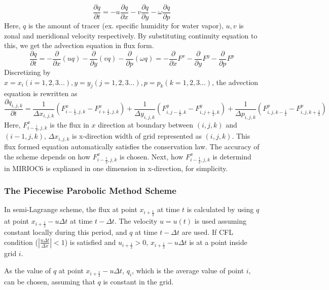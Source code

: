 \begin{equation}
\frac{\partial q}{\partial t} = -u \frac{\partial q}{\partial x}-v \frac{\partial q}{\partial y}-\omega \frac{\partial q}{\partial p}
\end{equation}
Here, $q$ is the amount of tracer (ex. specific humidity for water vapor), $u,v$ is zonal and meridional velocity respectively.
By substituting continuity equation to this, we get the advection equation in flux form.
\begin{equation}
  \frac{\partial q}{\partial t}=-\frac{\partial}{\partial x}(uq)-\frac{\partial}{\partial y}(vq)-\frac{\partial}{\partial p}(\omega q)
  =-\frac{\partial}{\partial x}F^{x}-\frac{\partial}{\partial y}F^{y}-\frac{\partial}{\partial p}F^{p}
\end{equation}
Discretizing by $x=x_{i} (i=1,2,3...), y=y_{j} (j=1,2,3...), p=p_{k} (k=1,2,3...)$, the advection equation is rewritten as
\begin{equation}
  \frac{\partial q_{i,j,k}}{\partial t}=\frac{1}{\Delta x_{i,j,k}}(F^{x}_{i-\frac{1}{2},j,k}-F^{x}_{i+\frac{1}{2},j,k})+\frac{1}{\Delta y_{i,j,k}}(F^{y}_{i,j-\frac{1}{2},k}-F^{y}_{i,j+\frac{1}{2},k})+\frac{1}{\Delta p_{i,j,k}}(F^{p}_{i,j,k-\frac{1}{2}}-F^{p}_{i,j,k+\frac{1}{2}})
\end{equation}
Here, $F^{x}_{i-\frac{1}{2},j,k}$ is the flux in $x$ direction at boundary between $(i,j,k)$ and $(i-1,j,k)$, $\Delta x_{i,j,k}$ is x-direction width of grid represented as $(i,j,k)$.
This flux formed equation automatically satisfies the conservation law.
The accuracy of the scheme depends on how $F^{x}_{i-\frac{1}{2},j,k}$ is chosen.
Next, how $F^{x}_{i-\frac{1}{2},j,k}$ is determind in MIRIOC6 is explianed in one dimension in x-direction, for simplicity.
\subsubsection{The Piecewise Parobolic Method  Scheme}
In semi-Lagrange scheme, the flux at point $x_{i+\frac{1}{2}}$ at time $t$ is calculated by using $q$ at point $x_{i+\frac{1}{2}}-u\Delta t$ at time $t-\Delta t$.
The velocity $u=u(t)$ is used assuming constant locally during this period, and $q$ at time $t-\Delta t$ are used.
If CFL condition ($|\frac{u\Delta t}{\Delta x}|<1$) is satisfied and $u_{i+\frac{1}{2}}>0$, $x_{i+\frac{1}{2}}-u\Delta t$ is at a point inside grid $i$.

As the value of $q$ at point $x_{i+\frac{1}{2}}-u\Delta t$, $q_{i}$, which is the average value of point $i$, can be chosen, assuming that $q$ is constant in the grid.

